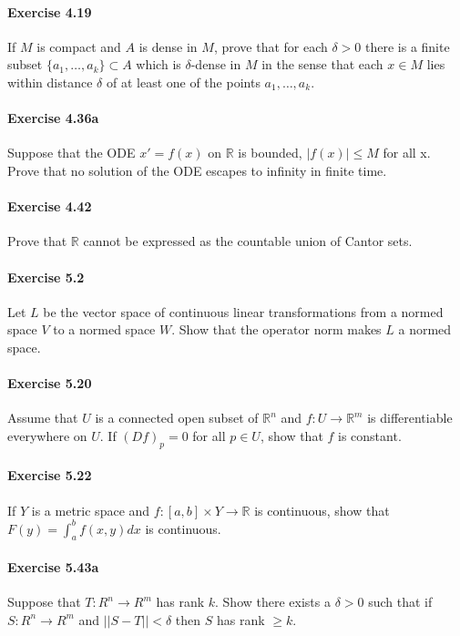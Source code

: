 \documentclass{article}
\begin{document}
\paragraph{Exercise 4.19} If $M$ is compact and $A$ is dense in $M$, prove that for each $\delta > 0$ there is a finite subset $\{a_1, \ldots , a_k\} \subset A$ which is $\delta$-dense in $M$ in the sense that each $x \in M$ lies within distance $\delta$ of at least one of the points $a_1,\ldots, a_k$.

\paragraph{Exercise 4.36a} Suppose that the ODE $x' = f(x)$ on $\mathbb{R}$ is bounded, $|f(x)| \leq M$ for all x. Prove that no solution of the ODE escapes to infinity in finite time.

\paragraph{Exercise 4.42} Prove that $\mathbb{R}$ cannot be expressed as the countable union of Cantor sets.

\paragraph{Exercise 5.2} Let $L$ be the vector space of continuous linear transformations from a normed space $V$ to a normed space $W$. Show that the operator norm makes $L$ a normed space.

\paragraph{Exercise 5.20} Assume that $U$ is a connected open subset of $\mathbb{R}^n$ and $f \colon U \rightarrow \mathbb{R}^m$ is differentiable everywhere on $U$. If $(Df)_p = 0$ for all $p \in U$, show that $f$ is constant.

\paragraph{Exercise 5.22} If $Y$ is a metric space and $f \colon [a, b] \times Y \rightarrow \mathbb{R}$ is continuous, show that $F(y) = \int^b_a f(x,y) dx$ is continuous.

\paragraph{Exercise 5.43a} Suppose that $T \colon R^n \rightarrow R^m$ has rank $k$.  Show there exists a $\delta > 0$ such that if $S \colon R^n \rightarrow R^m$ and $||S - T|| < \delta$ then $S$ has rank $\geq k$.
\end{document}
